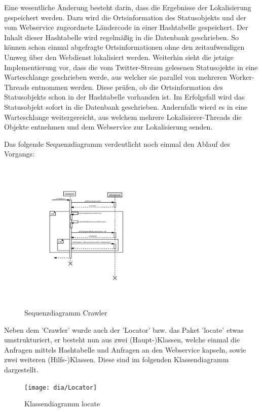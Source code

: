 Eine wesentliche Änderung besteht darin, dass die Ergebnisse der Lokalisierung gespeichert werden. Dazu wird die Ortsinformation des Statusobjekts und der vom Webservice zugeordnete Ländercode in einer Hashtabelle gespeichert. Der Inhalt dieser Hashtabelle wird regelmäßig in die Datenbank geschrieben. So können schon einmal abgefragte Ortsinformationen ohne den zeitaufwendigen Umweg über den Webdienst lokalisiert werden. 
Weiterhin sieht die jetzige Implementierung vor, dass die vom Twitter-Stream gelesenen Statusojekte in eine Warteschlange geschrieben werde, aus welcher sie parallel von mehreren Worker-Threads entnommen werden. Diese prüfen, ob die Ortsinformation des Statusobjekts schon in der Hashtabelle vorhanden ist. Im Erfolgsfall wird das Statusobjekt sofort in die Datenbank geschrieben. Andernfalls wierd es in eine  Warteschlange weitergereicht, aus welchem mehrere Lokalisierer-Threads die Objekte entnehmen und dem Webservice zur Lokalisierung senden.

Das folgende Sequenzdiagramm verdeutlicht noch einmal den Ablauf des Vorgangs:
\begin{figure}[H] %
	\centering
	\includegraphics[width=\textwidth,height=\textheight,keepaspectratio=true]{dia/categorizerSequence}
	\caption{Sequenzdiagramm Crawler}
	\label{fig:Crawler}
\end{figure}

Neben dem 'Crawler' wurde auch der 'Locator' bzw. das Paket 'locate' etwas umstrukturiert, er besteht nun aus zwei (Haupt-)Klassen, welche einmal die Anfragen mittels Hashtabelle und Anfragen an den Webservice kapseln, sowie zwei weiteren (Hilfs-)Klassen. Diese sind im folgenden Klassendiagramm dargestellt.
 \begin{figure}[H]
 	\centering
 	\texttt{[image: dia/Locator]}
 	\caption{Klassendiagramm locate}
 	\label{fig:locate}
 \end{figure}

